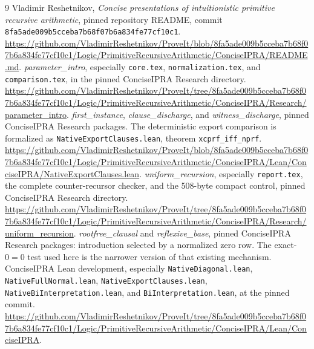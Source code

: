 \documentclass[11pt,letterpaper]{article}
\theoremstyle{definition}\newtheorem{definition}[theorem]{Definition}
\theoremstyle{remark}\newtheorem{remark}[theorem]{Remark}
\newcommand{\file}[1]{{\small\nolinkurl{#1}}}
\begin{document}
\begin{thebibliography}{9}\small
{} Vladimir Reshetnikov, \emph{Concise presentations of
intuitionistic primitive recursive arithmetic}, pinned repository README,
commit \texttt{8fa5ade009b5cceba7b68f07b6a834fe77cf10c1}.
\url{https://github.com/VladimirReshetnikov/ProveIt/blob/8fa5ade009b5cceba7b68f07b6a834fe77cf10c1/Logic/PrimitiveRecursiveArithmetic/ConciseIPRA/README.md}.
 \emph{parameter\_intro}, especially
\file{core.tex}, \file{normalization.tex}, and \file{comparison.tex},
in the pinned ConciseIPRA Research directory.
\url{https://github.com/VladimirReshetnikov/ProveIt/tree/8fa5ade009b5cceba7b68f07b6a834fe77cf10c1/Logic/PrimitiveRecursiveArithmetic/ConciseIPRA/Research/parameter_intro}.
 \emph{first\_instance}, \emph{clause\_discharge}, and
\emph{witness\_discharge}, pinned ConciseIPRA Research packages.
The deterministic export comparison is formalized as
\file{NativeExportClauses.lean}, theorem \texttt{xcprf\_iff\_nprf}.
\url{https://github.com/VladimirReshetnikov/ProveIt/blob/8fa5ade009b5cceba7b68f07b6a834fe77cf10c1/Logic/PrimitiveRecursiveArithmetic/ConciseIPRA/Lean/ConciseIPRA/NativeExportClauses.lean}.
 \emph{uniform\_recursion}, especially
\file{report.tex}, the complete counter-recursor checker, and the
508-byte compact control, pinned ConciseIPRA Research directory.
\url{https://github.com/VladimirReshetnikov/ProveIt/tree/8fa5ade009b5cceba7b68f07b6a834fe77cf10c1/Logic/PrimitiveRecursiveArithmetic/ConciseIPRA/Research/uniform_recursion}.
 \emph{rootfree\_clausal} and \emph{reflexive\_base},
pinned ConciseIPRA Research packages: introduction selected by a
normalized zero row. The exact-$0=0$ test used here is the narrower
version of that existing mechanism.
 ConciseIPRA Lean development, especially
\file{NativeDiagonal.lean}, \file{NativeFullNormal.lean},
\file{NativeExportClauses.lean}, \file{NativeBiInterpretation.lean},
and \file{BiInterpretation.lean}, at the pinned commit.
\url{https://github.com/VladimirReshetnikov/ProveIt/tree/8fa5ade009b5cceba7b68f07b6a834fe77cf10c1/Logic/PrimitiveRecursiveArithmetic/ConciseIPRA/Lean/ConciseIPRA}.
\end{thebibliography}
\end{document}
